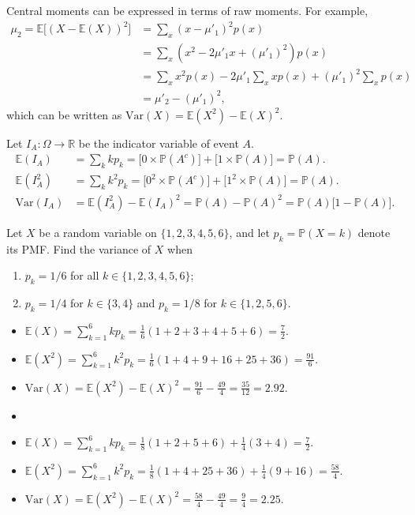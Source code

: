 \documentclass[lecture]{csm}
\newcommand{\R}{\mathbb{R}}
\newcommand{\prob}{\mathbb{P}}
\newcommand{\expe}{\mathbb{E}}
\newcommand{\var}{\text{Var}}
\def\it{\item}
\def\bit{\begin{itemize}}
\def\eit{\end{itemize}}
\def\ben{\begin{enumerate}}
\def\een{\end{enumerate}}
\begin{document}
\begin{remark}
Central moments can be expressed in terms of raw moments. For example,
\begin{align*}
\mu_2 = \expe\big[(X-\expe(X))^2\big]
	& = \sum_x(x-\mu'_1)^2 p(x) \\
	& = \sum_x(x^2 - 2\mu'_1 x + (\mu'_1)^2) p(x) \\
	& = \sum_x x^2 p(x) - 2\mu'_1\sum_x x p(x) + (\mu'_1)^2\sum_x p(x) \\
	& = \mu'_2 - (\mu'_1)^2,
\end{align*}
which can be written as $\var(X) = \expe(X^2) - \expe(X)^2$. 
\end{remark}

\begin{example}
Let $I_A:\Omega\to\R$ be the indicator variable of event $A$. 
\begin{align*}
\expe(I_A) 		& = \sum_k k p_k 	= \big[0\times \prob(A^c)\big] + \big[1\times \prob(A)\big] = \prob(A). \\
\expe(I_A^2)		& = \sum_k k^2 p_k 	= \big[0^2\times \prob(A^c)\big] + \big[1^2\times \prob(A)\big] = \prob(A). \\
\var(I_A)		& = \expe(I_A^2)-\expe(I_A)^2  = \prob(A) - \prob(A)^2 = \prob(A)\big[1-\prob(A)\big].
\end{align*}
\end{example}

\begin{example}
Let $X$ be a random variable on $\{1,2,3,4,5,6\}$, and let $p_k=\prob(X=k)$ denote its PMF. Find the variance of $X$ when
\ben
\it $p_k=1/6$ for all $k\in\{1,2,3,4,5,6\}$;
\it $p_k=1/4$ for $k\in\{3,4\}$ and $p_k=1/8$ for $k\in\{1,2,5,6\}$.
\een
\end{example}

\begin{solution}
\bit
\it$\expe(X) 	= \sum_{k=1}^6 k p_k		= \frac{1}{6}(1+2+3+4+5+6)		= \frac{7}{2}$.
\it$\expe(X^2) 	= \sum_{k=1}^6 k^2 p_k	= \frac{1}{6}(1+4+9+16+25+36) 	= \frac{91}{6}$.
\it$\var(X)		= \expe(X^2)-\expe(X)^2 	= \frac{91}{6}-\frac{49}{4} 		= \frac{35}{12} = 2.92$.
\it[] 
\it$\expe(X)		= \sum_{k=1}^6 k p_k 	= \frac{1}{8}(1+2+5+6) + \frac{1}{4}(3+4) = \frac{7}{2}$.
\it$\expe(X^2)	= \sum_{k=1}^6 k^2 p_k	= \frac{1}{8}(1+4+25+36) + \frac{1}{4}(9+16) = \frac{58}{4}$.
\it$\var(X)		= \expe(X^2)-\expe(X)^2 	= \frac{58}{4} - \frac{49}{4} = \frac{9}{4} = 2.25$.
\eit
\end{solution}
\end{document}
